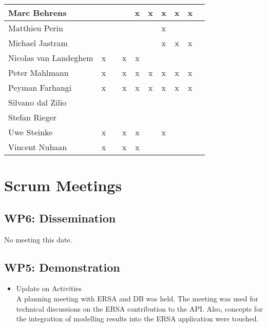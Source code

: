 \documentclass[a4paper, 11pt]{article}
\begin{document}
\begin{tabular}{|l|c|c|c||c|c|c||c|c|c|}
Marc Behrens          &   &   &   & x & x & x & x & x \\\hline
Matthieu Perin        &   &   &   &   &   & x &   &   \\\hline
Michael Jastram       &   &   &   &   &   & x & x & x \\\hline
Nicolas van Landeghem & x &   & x & x &   &   &   &   \\\hline
Peter Mahlmann        & x &   & x & x & x & x & x & x \\\hline
Peyman Farhangi       & x &   & x & x & x & x & x & x \\\hline
Silvano dal Zilio     &   &   &   &   &   &   &   &   \\\hline
Stefan Rieger         &   &   &   &   &   &   &   &   \\\hline
Uwe Steinke           & x &   & x & x &   & x &   &   \\\hline
Vincent Nuhaan        & x &   & x & x &   &   &   &   \\\hline
\end{tabular}


\section{Scrum Meetings}

\subsection{WP6: Dissemination}

No meeting this date.

\subsection{WP5: Demonstration}
\begin{itemize}
\item Update on Activities\\
A planning meeting with ERSA and DB was held. The meeting was used for technical discussions on the ERSA contribution to the API. Also, concepts for the integration of modelling results into the ERSA application were touched.
\end{itemize}
\end{document}
